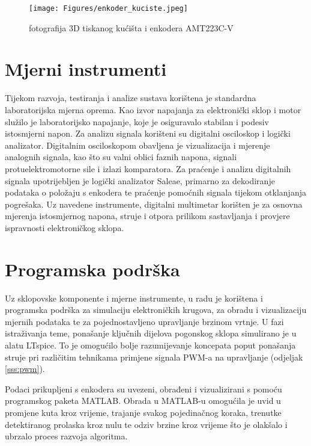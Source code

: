 \documentclass[diplomskirad]{fer}
\begin{document}
\begin{figure}[h!]
	\centering
	\texttt{[image: Figures/enkoder\_kuciste.jpeg]}
	\caption{fotografija 3D tiskanog kućišta i enkodera AMT223C-V}
	\label{fig:enkoder_kuciste}
\end{figure}

\section{Mjerni instrumenti}
\label{sec:mjerni_instrumenti}

Tijekom razvoja, testiranja i analize sustava korištena je standardna
laboratorijska mjerna oprema. Kao izvor napajanja za elektronički sklop i motor
služilo je laboratorijsko napajanje, koje je osiguravalo stabilan i podesiv
istosmjerni napon. Za analizu signala korišteni su digitalni osciloskop i
logički analizator. Digitalnim osciloskopom obavljena je vizualizacija i
mjerenje analognih signala, kao što su valni oblici faznih napona, signali
protuelektromotorne sile i izlazi komparatora. Za praćenje i analizu digitalnih
signala upotrijebljen je logički analizator Saleae, primarno za dekodiranje
podataka o položaju s enkodera te praćenje pomoćnih signala tijekom otklanjanja
pogrešaka. Uz navedene instrumente, digitalni multimetar korišten je za osnovna
mjerenja istosmjernog napona, struje i otpora prilikom sastavljanja i provjere
ispravnosti elektroničkog sklopa.

\section{Programska podrška}
\label{sec:programska_podrska}

Uz sklopovske komponente i mjerne instrumente, u radu je korištena i programska
podrška za simulaciju elektroničkih krugova, za obradu i vizualizaciju mjernih
podataka te za pojednostavljeno upravljanje brzinom vrtnje. U fazi istraživanja
teme, ponašanje ključnih dijelova pogonskog sklopa simulirano je u alatu
LTspice. To je omogućilo bolje razumijevanje koncepata poput ponašanja struje
pri različitim tehnikama primjene signala PWM-a na upravljanje (odjeljak
\ref{sss:pwm}).

Podaci prikupljeni s enkodera su uvezeni, obrađeni i vizualizirani s pomoću
programskog paketa MATLAB. Obrada u MATLAB-u omogućila je uvid u promjene kuta
kroz vrijeme, trajanje svakog pojedinačnog koraka, trenutke detektiranog
prolaska kroz nulu te odziv brzine kroz vrijeme što je olakšalo i ubrzalo
proces razvoja algoritma.
\end{document}
